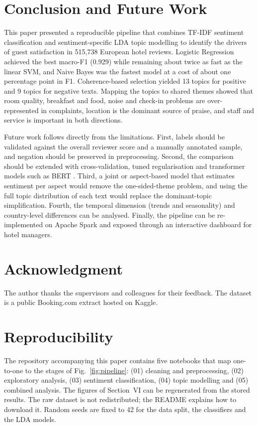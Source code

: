 \documentclass[11pt,journal,draftclsnofoot,onecolumn]{IEEEtran}
\begin{document}
\section{Conclusion and Future Work}
This paper presented a reproducible pipeline that combines TF-IDF sentiment classification and sentiment-specific LDA topic modelling to identify the drivers of guest satisfaction in 515,738 European hotel reviews. Logistic Regression achieved the best macro-F1 (0.929) while remaining about twice as fast as the linear SVM, and Naive Bayes was the fastest model at a cost of about one percentage point in F1. Coherence-based selection yielded 13 topics for positive and 9 topics for negative texts. Mapping the topics to shared themes showed that room quality, breakfast and food, noise and check-in problems are over-represented in complaints, location is the dominant source of praise, and staff and service is important in both directions.

Future work follows directly from the limitations. First, labels should be validated against the overall reviewer score and a manually annotated sample, and negation should be preserved in preprocessing. Second, the comparison should be extended with cross-validation, tuned regularisation and transformer models such as BERT \cite{devlin2019}. Third, a joint or aspect-based model that estimates sentiment per aspect would remove the one-sided-theme problem, and using the full topic distribution of each text would replace the dominant-topic simplification. Fourth, the temporal dimension (trends and seasonality) and country-level differences can be analysed. Finally, the pipeline can be re-implemented on Apache Spark and exposed through an interactive dashboard for hotel managers.

\section*{Acknowledgment}
The author thanks the supervisors and colleagues for their feedback. The dataset is a public Booking.com extract hosted on Kaggle.

\appendices
\section{Reproducibility}
The repository accompanying this paper contains five notebooks that map one-to-one to the stages of Fig.~\ref{fig:pipeline}: (01) cleaning and preprocessing, (02) exploratory analysis, (03) sentiment classification, (04) topic modelling and (05) combined analysis. The figures of Section~VI can be regenerated from the stored results. The raw dataset is not redistributed; the README explains how to download it. Random seeds are fixed to 42 for the data split, the classifiers and the LDA models.
\end{document}
